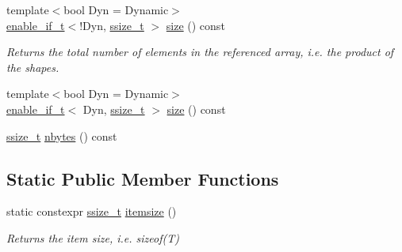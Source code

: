 \begin{DoxyCompactItemize}
{\footnotesize template$<$bool Dyn = Dynamic$>$ }\\\mbox{\hyperlink{detail_2common_8h_a012819c9e8b5e04872a271f50f8b8196}{enable\+\_\+if\+\_\+t}}$<$!Dyn, \mbox{\hyperlink{detail_2common_8h_ac430d16fc097b3bf0a7469cfd09decda}{ssize\+\_\+t}} $>$ \mbox{\hyperlink{classunchecked__reference_af1713056b2abec0c2b0fa62e78464537}{size}} () const
\begin{DoxyCompactList}\small\item\em Returns the total number of elements in the referenced array, i.\+e. the product of the shapes. \end{DoxyCompactList}\item 
{\footnotesize template$<$bool Dyn = Dynamic$>$ }\\\mbox{\hyperlink{detail_2common_8h_a012819c9e8b5e04872a271f50f8b8196}{enable\+\_\+if\+\_\+t}}$<$ Dyn, \mbox{\hyperlink{detail_2common_8h_ac430d16fc097b3bf0a7469cfd09decda}{ssize\+\_\+t}} $>$ \mbox{\hyperlink{classunchecked__reference_a57965f6ebdfe65d50947decec3a4896b}{size}} () const
\item 
\mbox{\hyperlink{detail_2common_8h_ac430d16fc097b3bf0a7469cfd09decda}{ssize\+\_\+t}} \mbox{\hyperlink{classunchecked__reference_a9c15e1b4f748ca5d8396e637c4d9abb4}{nbytes}} () const
\end{DoxyCompactItemize}
\subsection*{Static Public Member Functions}
\begin{DoxyCompactItemize}
\item 
static constexpr \mbox{\hyperlink{detail_2common_8h_ac430d16fc097b3bf0a7469cfd09decda}{ssize\+\_\+t}} \mbox{\hyperlink{classunchecked__reference_aef7c3ce5d4353713c19e71fe2afb8ff6}{itemsize}} ()
\begin{DoxyCompactList}\small\item\em Returns the item size, i.\+e. sizeof(\+T) \end{DoxyCompactList}\end{DoxyCompactItemize}
